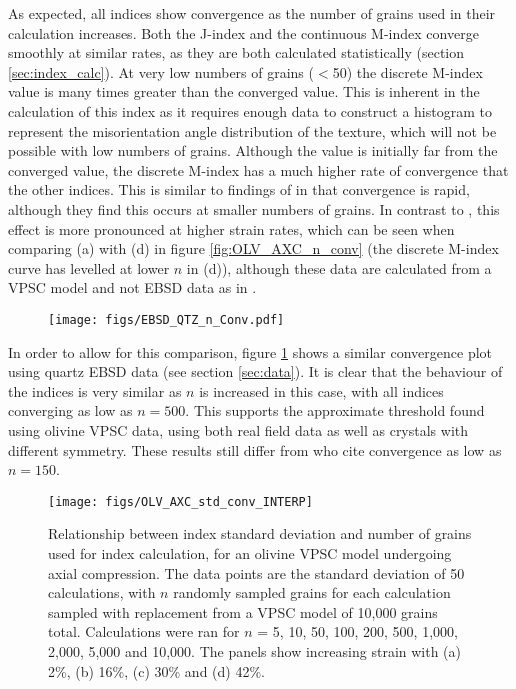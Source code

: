 \documentclass[a4paper,12pt]{report}
\numberwithin{equation}{chapter}
\begin{document}
As expected, all indices show convergence as the number of grains used in their calculation increases. Both the J-index and the continuous M-index converge smoothly at similar rates, as they are both calculated statistically (section \ref{sec:index_calc}). At very low numbers of grains ($<$50) the discrete M-index value is many times greater than the converged value. This is inherent in the calculation of this index as it requires enough data to construct a histogram to represent the misorientation angle distribution of the texture, which will not be possible with low numbers of grains. Although the value is initially far from the converged value, the discrete M-index has a much higher rate of convergence that the other indices. This is similar to findings of \cite{Skemer} in that convergence is rapid, although they find this occurs at smaller numbers of grains. In contrast to \cite{Skemer}, this effect is more pronounced at higher strain rates, which can be seen when comparing (a) with (d) in figure \ref{fig:OLV_AXC_n_conv} (the discrete M-index curve has levelled at lower $n$ in (d)), although these data are calculated from a VPSC model and not EBSD data as in \cite{Skemer}.

\begin{figure}[t!]
  \centering
    \texttt{[image: figs/EBSD\_QTZ\_n\_Conv.pdf]}
  \caption[Convergence with no. of grains (quartz EBSD)]{}
  \label{fig:EBSD_QTZ_n_conv}
\end{figure}

In order to allow for this comparison, figure \ref{fig:EBSD_QTZ_n_conv} shows a similar convergence plot using quartz EBSD data (see section \ref{sec:data}). It is clear that the behaviour of the indices is very similar as $n$ is increased in this case, with all indices converging as low as $n = 500$. This supports the approximate threshold found using olivine VPSC data, using both real field data as well as crystals with  different symmetry. These results still differ from \cite{Skemer} who cite convergence as low as $n = 150$. 

      
\begin{figure}[h!]
  \centering
    \texttt{[image: figs/OLV\_AXC\_std\_conv\_INTERP]}
  \caption[Index error with no. grains (olivine)]{Relationship between index standard deviation and number of grains used for index calculation, for an olivine VPSC model undergoing axial compression. The data points are the standard deviation of 50 calculations, with $n$ randomly sampled grains for each calculation sampled with replacement from a VPSC model of 10,000 grains total. Calculations were ran for $n$ = 5, 10, 50, 100, 200, 500, 1,000, 2,000, 5,000 and 10,000. The panels show increasing strain with (a) 2\%, (b) 16\%, (c) 30\% and (d) 42\%. }
  \label{fig:OLV_AXC_n_conv_err}
\end{figure}
\end{document}
